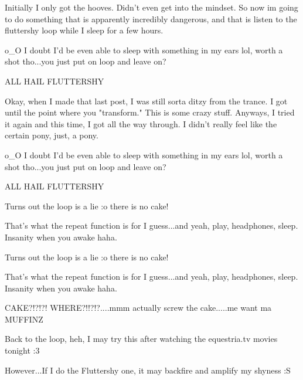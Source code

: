 \documentclass[ebook,12pt,oneside,openany]{memoir}
\newcommand{\mytexttilde}{\raisebox{0.5ex}{\texttildelow}}
\begin{document}
\begin{tcolorbox}[title=\mytexttilde{}Chaotic Parsley\mytexttilde{},colback=cyan!5!white,colframe=cyan!75!black,coltitle=white]
\begin{tcolorbox}[title=Creeping Dusk]
\par{Initially I only got the hooves. Didn't even get into the mindset. So now im going to do something that is apparently incredibly dangerous, and that is listen to the fluttershy loop while I sleep for a few hours. }
\end{tcolorbox}
\par{o\_O I doubt I'd be even able to sleep with something in my ears lol, worth a shot tho...you just put on loop and leave on? }
\newline{}
\par{ALL HAIL FLUTTERSHY}
\end{tcolorbox}
\begin{tcolorbox}[title=go away seb]
\par{Okay, when I made that last post, I was still sorta ditzy from the trance. I got until the point where you "transform." This is some crazy stuff. Anyways, I tried it again and this time, I got all the way through. I didn't really feel like the certain pony, just, a pony.}
\end{tcolorbox}
\begin{tcolorbox}[title=Agent505,colback=pink!5!white,colframe=pink!75!black,coltitle=white]
\begin{tcolorbox}[title=Parsleyshy]
\par{o\_O I doubt I'd be even able to sleep with something in my ears lol, worth a shot tho...you just put on loop and leave on? }
\newline{}
\par{ALL HAIL FLUTTERSHY}
\end{tcolorbox}
\par{Turns out the loop is a lie :o there is no cake!}
\par{That's what the repeat function is for I guess...and yeah, play, headphones, sleep. Insanity when you awake haha.}
\end{tcolorbox}
\begin{tcolorbox}[title=\mytexttilde{}Chaotic Parsley\mytexttilde{},colback=cyan!5!white,colframe=cyan!75!black,coltitle=white]
\begin{tcolorbox}[title=Creeping Dusk]
\par{Turns out the loop is a lie :o there is no cake!}
\par{That's what the repeat function is for I guess...and yeah, play, headphones, sleep. Insanity when you awake haha.}
\end{tcolorbox}
\par{CAKE?!?!?! WHERE?!!?!?....mmm actually screw the cake.....me want ma MUFFINZ }
\newline{}
\par{Back to the loop, heh, I may try this after watching the equestria.tv movies tonight :3}
\newline{}
\par{However...If I do the Fluttershy one, it may backfire and amplify my shyness :S}
\end{tcolorbox}
\end{document}
